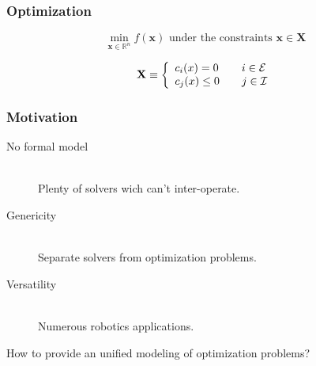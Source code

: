 \documentclass[14pt,utf8,hyperref={pdfpagelabels=false}]{beamer}
\begin{document}
\begin{slideDecision}
  \begin{changeleftmargin}{1.1cm}
    \frametitle{Optimization}


    \begin{equation*}
      \min_{\mathbf{x} \in \mathbb{R}^n} f(\mathbf{x})%
      \text{ under the constraints } \mathbf{x} \in \mathbf{X}
    \end{equation*}

    \begin{equation*}
      \mathbf{X} \equiv \left\{
      \begin{array}{l l}
        c_i (x) = 0    & \quad i \in \mathcal{E} \\
        c_j (x) \leq 0 & \quad j \in \mathcal{I} \\
      \end{array} \right.
    \end{equation*}

  \end{changeleftmargin}
\end{slideDecision}

\begin{slideDecision}
  \begin{changeleftmargin}{1.1cm}
    \frametitle{Motivation}


    \begin{center}
      \begin{description}
        \item[No formal model]~\\
          Plenty of solvers wich can't inter-operate.
        \item[Genericity]~\\
          Separate solvers from optimization problems.
        \item[Versatility]~\\
          Numerous robotics applications.
      \end{description}
    \end{center}
    \vspace{1cm}

    How to provide an \alert{unified modeling} of optimization
    problems?
  \end{changeleftmargin}
\end{slideDecision}
\end{document}

